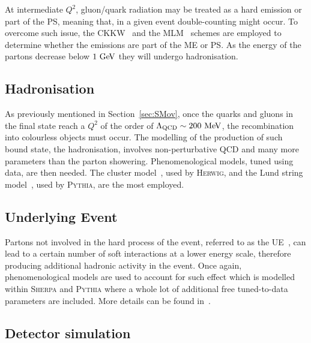 			At intermediate $Q^2$, gluon/quark radiation may be treated as a hard emission or part of the \ac{PS}, meaning that, in a given event double-counting might occur. To overcome such issue, the \ac{CKKW}~\cite{QCD2001} and the \ac{MLM}~\cite{ME2001} schemes are employed to determine whether the emissions are part of the \ac{ME} or \ac{PS}. As the energy of the partons decrease below $1 \GeV$ they will undergo hadronisation.

		\subsection*{Hadronisation}

			As previously mentioned in Section~\ref{sec:SMov}, once the quarks and gluons in the final state reach a $Q^2$ of the order of $\Lambda_{\mathrm{QCD}} \sim 200 \MeV$, the recombination into colourless objects must occur. The modelling of the production of such bound state, the hadronisation, involves non-perturbative \ac{QCD} and many more parameters than the parton showering. Phenomenological models, tuned using data, are then needed. The cluster model~\cite{ClusterHerwig1999}, used by \textsc{Herwig}, and the Lund string model~\cite{LundModel2002}, used by \textsc{Pythia}, are the most employed. 

		\subsection*{Underlying Event}

			Partons not involved in the hard process of the event, referred to as the \ac{UE}~\cite{Field2008}, can lead to a certain number of soft interactions at a lower energy scale, therefore producing additional hadronic activity in the event. Once again, phenomenological models are used to account for such effect which is modelled within \textsc{Sherpa} and \textsc{Pythia} where a whole lot of additional free tuned-to-data parameters are included. More details can be found in~\cite{Field2008}.

		\subsection*{Detector simulation}
		\label{subsec:detSim}


